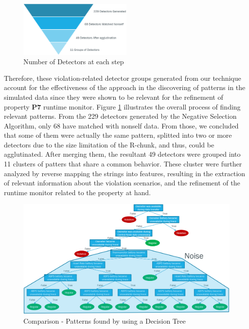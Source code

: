 \begin{figure}[!h]
	\centering
	\includegraphics[width=0.5\textwidth, keepaspectratio]{img/detector_piramid.png}
	\caption{Number of Detectors at each step}
	\label{fig:pyramid}
\end{figure}

Therefore, these violation-related detector groups generated from our technique account for the effectiveness of the approach in the discovering of patterns in the simulated data since they were shown to be relevant for the refinement of property \textbf{P7} runtime monitor. Figure \ref{fig:pyramid} illustrates the overall process of finding relevant patterns. From the 229 detectors generated by the Negative Selection Algorithm, only 68 have matched with nonself data. From those, we concluded that some of them were actually the same pattern, splitted into two or more detectors due to the size limitation of the R-chunk, and thus, could be agglutinated. After merging them, the resultant 49 detectors were grouped into 11 clusters of patters that share a common behavior. These cluster were further analyzed by reverse mapping the strings into features, resulting in the extraction of relevant information about the violation scenarios, and the refinement of the runtime monitor related to the property at hand.

\begin{figure}[!h]
	\centering
	\includegraphics[width=\textwidth, keepaspectratio]{img/DecisionTree-patterns.png}
	\caption{Comparison - Patterns found by using a Decision Tree}
	\label{fig:decisionTreePatterns}
\end{figure}


